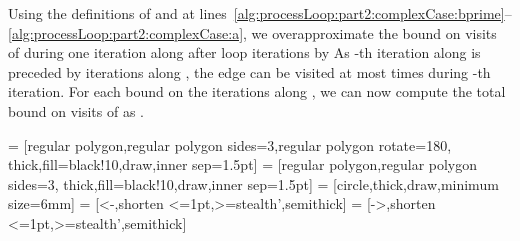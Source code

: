\documentclass[10pt,a4paper]{article}
\begin{document}
Using the definitions of  and  at
lines~\ref{alg:processLoop:part2:complexCase:bprime}--\ref{alg:processLoop:part2:complexCase:a},
we overapproximate the bound  on visits of  during
one iteration along  after  loop iterations by
 As -th iteration along
 is preceded by  iterations along , the edge  can be visited
at most  times during -th iteration. For each
bound  on the iterations along , we can now compute
the total bound on visits of  as
.
 
\begin{figure*}[!t]
\centering
{} = [regular polygon,regular polygon sides=3,regular polygon rotate=180,
  thick,fill=black!10,draw,inner sep=1.5pt]
 = [regular polygon,regular polygon sides=3,
  thick,fill=black!10,draw,inner sep=1.5pt]
 = [circle,thick,draw,minimum size=6mm]
 = [<-,shorten <=1pt,>=stealth',semithick]
 = [->,shorten <=1pt,>=stealth',semithick]


\end{figure*}
\end{document}
